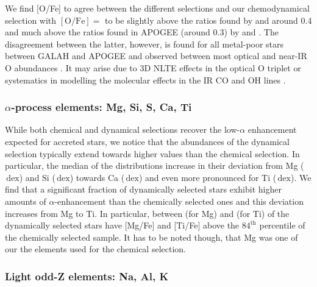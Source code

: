 \documentclass[fleqn,usenatbib]{mnras}
\newcommand{\added}[1]{#1}
\newcommand{\dex}{\,\mathrm{dex}}	%
\begin{document}
We find [O/Fe] to agree between the different selections and our chemodynamical selection with $\mathrm{[O/Fe]} =$  to be slightly above the ratios found by \citet{Ramirez2012b} and \citet{Nissen2014} around 0.4 and much above the ratios found in APOGEE (around 0.3) by \citet{Hawkins2015} and \citet{Hayes2018}. The disagreement between the latter, however, is found for all metal-poor stars between GALAH and APOGEE \citep[e.g.][]{Buder2018} \added{and observed between most optical and near-IR O abundances \citep[e.g.,][]{Bensby2014}. It may arise due to 3D NLTE effects in the optical O triplet \citep[e.g.,][]{Amarsi2020} or systematics in modelling the molecular effects in the IR CO and OH lines \citep[e.g.,][]{Collet2007, Hayek2011}.}

\subsubsection{$\alpha$-process elements: Mg, Si, S, Ca, Ti} \label{sec:chronochemodynamics_alpha}

While both chemical and dynamical selections recover the low-$\alpha$ enhancement expected for accreted stars, we notice that the abundances of the dynamical selection typically extend towards higher values than the chemical selection. In particular, the median of the distributions increase in their deviation from Mg ($\dex$) and Si ($\dex$) towards Ca ($\dex$) and even more pronounced for Ti ($\dex$). We find that a significant fraction of dynamically selected stars exhibit higher amounts of $\alpha$-enhancement than the chemically selected ones and this deviation increases from Mg to Ti. In particular, between  (for Mg) and  (for Ti) of the dynamically selected stars have [Mg/Fe] and [Ti/Fe] above the $84^\text{th}$ percentile of the chemically selected sample. It has to be noted though, that Mg was one of our the elements used for the chemical selection.

\subsubsection{Light odd-Z elements: Na, Al, K} \label{sec:chronochemodynamics_oddz}
\end{document}
